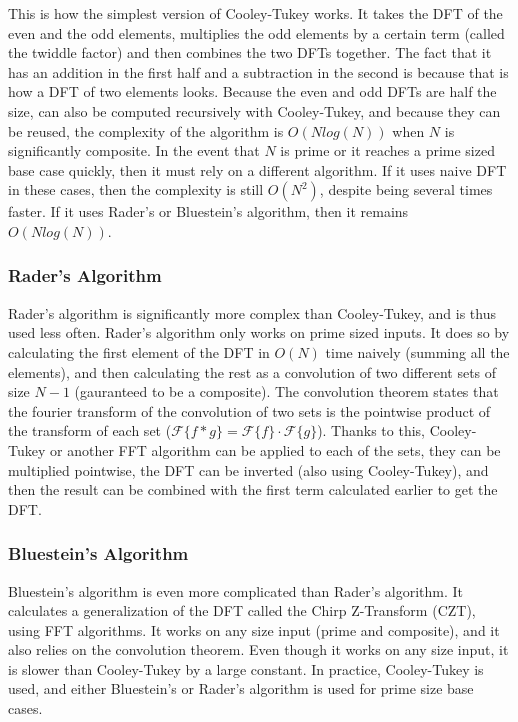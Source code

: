 		This is how the simplest version of Cooley-Tukey works. It takes the DFT of the even and the odd elements, multiplies the odd elements by a certain term (called the twiddle factor) and then combines the two DFTs together. The fact that it has an addition in the first half and a subtraction in the second is because that is how a DFT of two elements looks. Because the even and odd DFTs are half the size, can also be computed recursively with Cooley-Tukey, and because they can be reused, the complexity of the algorithm is $O(Nlog(N))$ when $N$ is significantly composite. In the event that $N$ is prime or it reaches a prime sized base case quickly, then it must rely on a different algorithm. If it uses naive DFT in these cases, then the complexity is still $O(N^2)$, despite being several times faster. If it uses Rader's or Bluestein's algorithm, then it remains $O(Nlog(N))$.
	\subsubsection{Rader's Algorithm}
		\label{raders}
		Rader's algorithm is significantly more complex than Cooley-Tukey, and is thus used less often. Rader's algorithm only works on prime sized inputs. It does so by calculating the first element of the DFT in $O(N)$ time naively (summing all the elements), and then calculating the rest as a convolution of two different sets of size $N-1$ (gauranteed to be a composite). The convolution theorem states that the fourier transform of the convolution of two sets is the pointwise product of the transform of each set ($\mathcal{F}\{f*g\}=\mathcal{F}\{f\}\cdot\mathcal{F}\{g\}$). Thanks to this, Cooley-Tukey or another FFT algorithm can be applied to each of the sets, they can be multiplied pointwise, the DFT can be inverted (also using Cooley-Tukey), and then the result can be combined with the first term calculated earlier to get the DFT.
	\subsubsection{Bluestein's Algorithm}
		Bluestein's algorithm is even more complicated than Rader's algorithm. It calculates a generalization of the DFT called the Chirp Z-Transform (CZT), using FFT algorithms. It works on any size input (prime and composite), and it also relies on the convolution theorem. Even though it works on any size input, it is slower than Cooley-Tukey by a large constant. In practice, Cooley-Tukey is used, and either Bluestein's or Rader's algorithm is used for prime size base cases.
